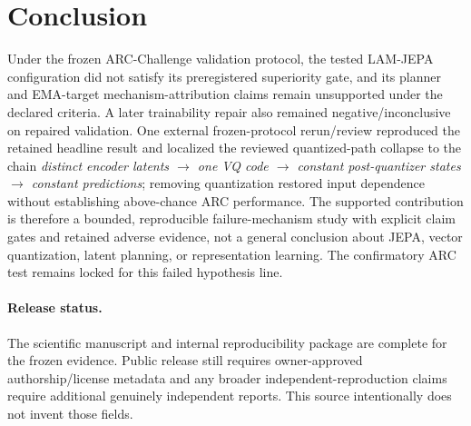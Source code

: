 \documentclass[11pt]{article}
\begin{document}
\section{Conclusion}
Under the frozen ARC-Challenge validation protocol, the tested LAM-JEPA configuration did not satisfy its preregistered superiority gate, and its planner and EMA-target mechanism-attribution claims remain unsupported under the declared criteria. A later trainability repair also remained negative/inconclusive on repaired validation. One external frozen-protocol rerun/review reproduced the retained headline result and localized the reviewed quantized-path collapse to the chain \emph{distinct encoder latents $\rightarrow$ one VQ code $\rightarrow$ constant post-quantizer states $\rightarrow$ constant predictions}; removing quantization restored input dependence without establishing above-chance ARC performance. The supported contribution is therefore a bounded, reproducible failure-mechanism study with explicit claim gates and retained adverse evidence, not a general conclusion about JEPA, vector quantization, latent planning, or representation learning. The confirmatory ARC test remains locked for this failed hypothesis line.

\paragraph{Release status.} The scientific manuscript and internal reproducibility package are complete for the frozen evidence. Public release still requires owner-approved authorship/license metadata and any broader independent-reproduction claims require additional genuinely independent reports. This source intentionally does not invent those fields.



\end{document}
